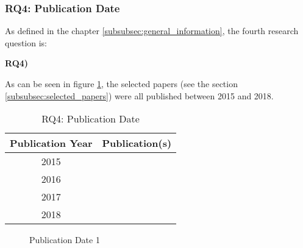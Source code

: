 
\clearpage
\subsubsection{RQ4: Publication Date}
\label{subsubsec:rq4_publication_date}
As defined in the chapter \ref{subsubsec:general_information}, the fourth research question is:
\begin{displayquote}
\textbf{RQ4) }
\end{displayquote}
As can be seen in figure \ref{tab:rq4_publication_date}, the selected papers (see the section \ref{subsubsec:selected_papers}) were all published between 2015 and 2018. \\
\begin{longtable}{ |c|c| }
	\caption{RQ4: Publication Date} \label{tab:rq4_publication_date} \\
	\hline
 	Publication Year & Publication(s) \\ [0.5ex] 
 	\hline\hline
 		2015  & \cite{2015_Dennis,2015_Zyskind} \\ 
	 \hline
	 2016 & \cite{2016_Azaria,2016_Bahga,2016_Jacynycz,2016_Kianmajd,2016_Schaub,2016_Sharples,2016_Tian,2016_Yasin,2016_Yue} \\  
	 \hline
	 2017 & \cite{2017_Coyne,2017_Gipp,2017_Jaag,2017_Liu,2017_Madhwal,2017_Naerland,2017_Ouaddah,2017_Tackmann} \\
	 \hline
	 2018 & \cite{2018_Alessandra,2018_Lucena} \\
	 \hline
\end{longtable}

\begin{figure}[!ht]
	\centering
	\caption{Publication Date 1} \label{graph:rq4_publication_date_1}
\end{figure}


\clearpage
